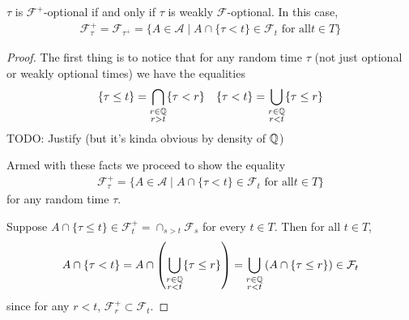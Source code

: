 \begin{lem}\label{WeaklyOptionalCharacterization}$\tau$ is $\mathcal{F}^+$-optional if and only if $\tau$ is
  weakly $\mathcal{F}$-optional.  In this case, 
\begin{align*}
\mathcal{F}^+_\tau = \mathcal{F}_{\tau^+} = \lbrace A \in \mathcal{A}
\mid A \cap \lbrace \tau < t \rbrace \in \mathcal{F}_t \text { for all
} t \in T \rbrace
\end{align*}
\end{lem}
\begin{proof}
The first thing is to notice that for any random time $\tau$ (not just
optional or weakly optional times) we have the equalities
\begin{align*}
&\lbrace \tau \leq t \rbrace = \bigcap_{\substack{
r \in \mathbb{Q} \\
r >  t}} 
\lbrace \tau < r \rbrace
&\lbrace \tau < t \rbrace = \bigcup_{\substack{
r \in \mathbb{Q} \\ 
r < t}} 
\lbrace \tau \leq r \rbrace
\end{align*}
TODO: Justify (but it's kinda obvious by density of $\mathbb{Q}$)

Armed with these facts we proceed to show the equality 
\begin{align*}
\mathcal{F}^+_{\tau} = \lbrace A \in \mathcal{A}
\mid A \cap \lbrace \tau < t \rbrace \in \mathcal{F}_t \text { for all
} t \in T \rbrace
\end{align*} 
for any random time $\tau$.

Suppose $A \cap \lbrace \tau \leq t \rbrace \in \mathcal{F}^+_t =
\cap_{s>t} \mathcal{F}_s$ for every $t \in T$.  Then for all $t  \in T$,
\begin{align*}
A \cap \lbrace \tau < t \rbrace &= A \cap \left (\bigcup_{\substack{r \in \mathbb{Q} \\ r <
  t}} \lbrace \tau \leq r \rbrace \right ) =\bigcup_{\substack{r \in \mathbb{Q} \\ r <
  t}}  \left ( A \cap \lbrace \tau \leq r \rbrace \right ) \in \mathcal{F}_t\\
\end{align*}
since for any $r < t$, $\mathcal{F}^+_r \subset \mathcal{F}_t$.


\end{proof}
